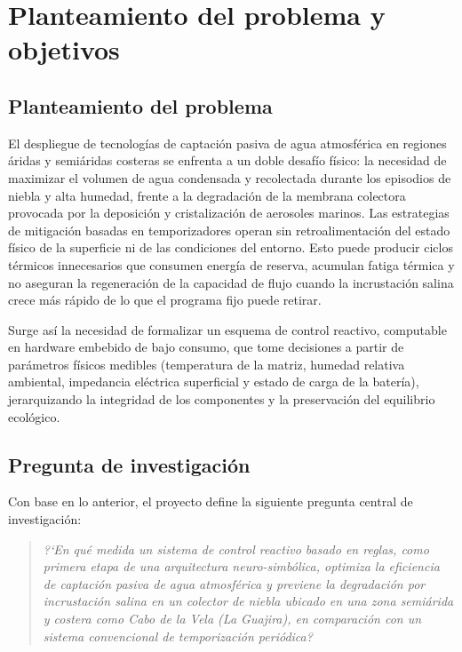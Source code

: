 \chapter{Planteamiento del problema y objetivos}
\label{cap:planteamiento}

\section{Planteamiento del problema}
El despliegue de tecnolog\'ias de captaci\'on pasiva de agua atmosf\'erica en regiones \'aridas y semi\'aridas costeras se enfrenta a un doble desaf\'io f\'isico: la necesidad de maximizar el volumen de agua condensada y recolectada durante los episodios de niebla y alta humedad, frente a la degradaci\'on de la membrana colectora provocada por la deposici\'on y cristalizaci\'on de aerosoles marinos. Las estrategias de mitigaci\'on basadas en temporizadores operan sin retroalimentaci\'on del estado f\'isico de la superficie ni de las condiciones del entorno. Esto puede producir ciclos t\'ermicos innecesarios que consumen energ\'ia de reserva, acumulan fatiga t\'ermica y no aseguran la regeneraci\'on de la capacidad de flujo cuando la incrustaci\'on salina crece m\'as r\'apido de lo que el programa fijo puede retirar.

Surge as\'i la necesidad de formalizar un esquema de control reactivo, computable en hardware embebido de bajo consumo, que tome decisiones a partir de par\'ametros f\'isicos medibles (temperatura de la matriz, humedad relativa ambiental, impedancia el\'ectrica superficial y estado de carga de la bater\'ia), jerarquizando la integridad de los componentes y la preservaci\'on del equilibrio ecol\'ogico.

\section{Pregunta de investigaci\'on}
\label{sec:pregunta}
Con base en lo anterior, el proyecto define la siguiente pregunta central de investigaci\'on:

\begin{quote}
\itshape
?`En qu\'e medida un sistema de control reactivo basado en reglas, como primera etapa de una arquitectura neuro-simb\'olica, optimiza la eficiencia de captaci\'on pasiva de agua atmosf\'erica y previene la degradaci\'on por incrustaci\'on salina en un colector de niebla ubicado en una zona semi\'arida y costera como Cabo de la Vela (La Guajira), en comparaci\'on con un sistema convencional de temporizaci\'on peri\'odica?
\end{quote}

